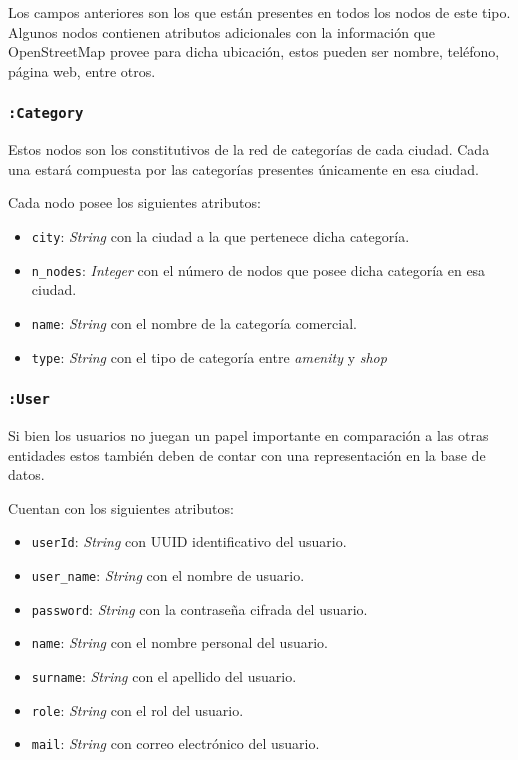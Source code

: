 Los campos anteriores son los que están presentes en todos los nodos de este tipo. Algunos nodos contienen atributos adicionales con la información que OpenStreetMap provee para dicha ubicación, estos pueden ser nombre, teléfono, página web, entre otros.

\subsubsection{\texttt{:Category}}
Estos nodos son los constitutivos de la red de categorías de cada ciudad. Cada una estará compuesta por las categorías presentes únicamente en esa ciudad.

Cada nodo posee los siguientes atributos:

\begin{itemize}
	\item \texttt{city}: \textit{String} con la ciudad a la que pertenece dicha categoría.
	\item \texttt{n\_nodes}: \textit{Integer} con el número de nodos que posee dicha categoría en esa ciudad.
	\item \texttt{name}: \textit{String} con el nombre de la categoría comercial.
	\item \texttt{type}: \textit{String} con el tipo de categoría entre \textit{amenity} y \textit{shop}
\end{itemize}

\subsubsection{\texttt{:User}}
Si bien los usuarios no juegan un papel importante en comparación a las otras entidades estos también deben de contar con una representación en la base de datos.

Cuentan con los siguientes atributos:

\begin{itemize}
	\item \texttt{userId}: \textit{String} con UUID identificativo del usuario.
	\item \texttt{user\_name}: \textit{String} con el nombre de usuario.
	\item \texttt{password}: \textit{String} con la contraseña cifrada del usuario.
	\item \texttt{name}: \textit{String} con el nombre personal del usuario.
	\item \texttt{surname}: \textit{String} con el apellido del usuario.
	\item \texttt{role}: \textit{String} con el rol del usuario.
	\item \texttt{mail}: \textit{String} con correo electrónico del usuario.
\end{itemize}

